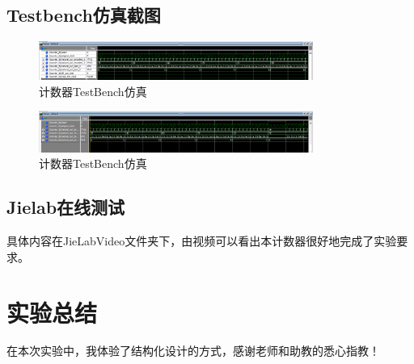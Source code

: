 \documentclass[UTF8]{article}
\begin{document}
\subsection{Testbench仿真截图}
\begin{figure}[h]
    \label{md}
    \centering
        \includegraphics[width=0.8\textwidth]{sc1.png}
        \caption{计数器TestBench仿真}
    \end{figure}
    \begin{figure}[h]
        \label{md}
        \centering
            \includegraphics[width=0.8\textwidth]{sc2.png}
            \caption{计数器TestBench仿真}
        \end{figure}

\subsection{Jielab在线测试}
具体内容在JieLabVideo文件夹下，由视频可以看出本计数器很好地完成了实验要求。

\section{实验总结}
在本次实验中，我体验了结构化设计的方式，感谢老师和助教的悉心指教！



\end{document}
